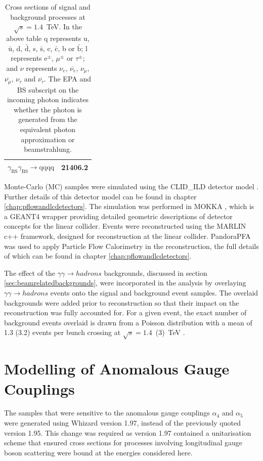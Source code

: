 \begin{table}[h!]
\begin{tabular}{ l r }
$\gamma_{\text{BS}}\gamma_{\text{BS}} \rightarrow \text{qqqq}$ & 21406.2\\
\hline
\end{tabular}
\caption[Cross sections of signal and background processes at $\sqrt{s}=1.4$~TeV]{Cross sections of signal and background processes at $\sqrt{s}=1.4$~TeV.  In the above table q represents u, $\bar{\text{u}}$, d, $\bar{\text{d}}$, s, $\bar{\text{s}}$, c, $\bar{\text{c}}$, b or $\bar{\text{b}}$;  l represents $\text{e}^{\pm}$, $\mu^{\pm}$ or $\tau^{\pm}$; and $\nu$ represents $\nu_{e}$, $\overline{\nu_{e}}$, $\nu_{\mu}$, $\overline{\nu_{\mu}}$, $\nu_{\tau}$ and $\overline{\nu_{\tau}}$.  The EPA and BS subscript on the incoming photon indicates whether the photon is generated from the equivalent photon approximation or beamstrahlung.}
\label{table:crosssection1400GeV}
\end{table}

Monte-Carlo (MC) samples were simulated using the CLID\_ILD detector model \cite{arXiv:1006.3396}.  Further details of this detector model can be found in chapter \ref{chap:pflowandlcdetectors}.  The simulation was performed in MOKKA \cite{MoradeFreitas:2002kj}, which is a GEANT4 \cite{Agostinelli:2002hh} wrapper providing detailed geometric descriptions of detector concepts for the linear collider.  Events were reconstructed using the MARLIN \cite{Gaede:2006pj} c++ framework, designed for reconstruction at the linear collider.  PandoraPFA \cite{arXiv:0907.3577, arXiv:1209.4039} was used to apply Particle Flow Calorimetry in the reconstruction, the full details of which can be found in chapter \ref{chap:pflowandlcdetectors}.
  
The effect of the $\gamma\gamma \rightarrow hadrons$ backgrounds, discussed in section \ref{sec:beamrelatedbackgrounds}, were incorporated in the analysis by overlaying $\gamma\gamma \rightarrow hadrons$ events onto the signal and background event samples.  The overlaid backgrounds were added prior to reconstruction so that their impact on the reconstruction was fully accounted for.  For a given event, the exact number of background events overlaid is drawn from a Poisson distribution with a mean of 1.3 (3.2) events per bunch crossing at $\sqrt{s}=1.4$~(3)~TeV \cite{Linssen:2012hp}.  
 

\section{Modelling of Anomalous Gauge Couplings}
\label{sec:modellingofanomalouscouplings}
The samples that were sensitive to the anomalous gauge couplings $\alpha_{4}$ and $\alpha_{5}$ were generated using Whizard version 1.97, instead of the previously quoted version 1.95.  This change was required as version 1.97 contained a unitarisation scheme that ensured cross sections for processes involving longitudinal gauge boson scattering were bound at the energies considered here.  

